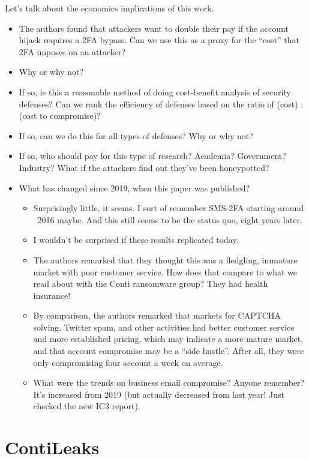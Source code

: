\documentclass[11pt]{article}
\begin{document}
    Let's talk about the economics implications of this work.
    \begin{itemize}
        \item The authors found that attackers want to double their pay if the account hijack requires a 2FA bypass. Can we use this as a proxy for the ``cost'' that 2FA imposes on an attacker?
        \item Why or why not?
        \item If so, is this a reasonable method of doing cost-benefit analysis of security defenses? Can we rank the efficiency of defenses based on the ratio of (cost) : (cost to compromise)?
        \item If so, can we do this for all types of defenses? Why or why not? 
        \item If so, who should pay for this type of research? Academia? Government? Industry? What if the attackers find out they've been honeypotted?
        \item What has changed since 2019, when this paper was published?
        \begin{itemize}
            \item Surprisingly little, it seems. I sort of remember SMS-2FA starting around ~2016 maybe. And this still seems to be the status quo, eight years later. 
            \item I wouldn't be surprised if these results replicated today. 
            \item The authors remarked that they thought this was a fledgling, immature market with poor customer service. How does that compare to what we read about with the Conti ransomware group? They had health insurance!
            \item By comparison, the authors remarked that markets for CAPTCHA solving, Twitter spam, and other activities had better customer service and more established pricing, which may indicate a more mature market, and that account compromise may be a ``side hustle''. After all, they were only compromising four account a week on average. 
            \item What were the trends on business email compromise? Anyone remember? It's increased from 2019 (but actually decreased from last year! Just checked the new IC3 report).
        \end{itemize}
    \end{itemize}


\section{ContiLeaks}
\end{document}

